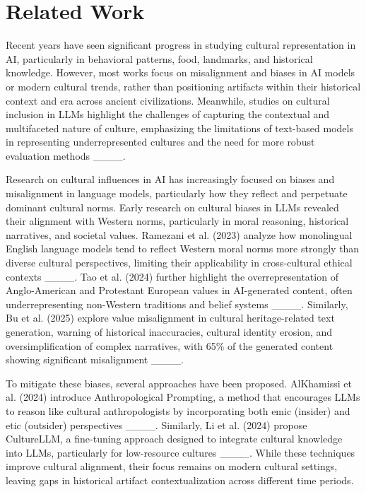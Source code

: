 \section{Related Work}
Recent years have seen significant progress in studying cultural representation in AI, particularly in behavioral patterns, food, landmarks, and historical knowledge. However, most works focus on misalignment and biases in AI models or modern cultural trends, rather than positioning artifacts within their historical context and era across ancient civilizations. Meanwhile, studies on cultural inclusion in LLMs highlight the challenges of capturing the contextual and multifaceted nature of culture, emphasizing the limitations of text-based models in representing underrepresented cultures and the need for more robust evaluation methods ____.

Research on cultural influences in AI has increasingly focused on biases and misalignment in language models, particularly how they reflect and perpetuate dominant cultural norms. Early research on cultural biases in LLMs revealed their alignment with Western norms, particularly in moral reasoning, historical narratives, and societal values. Ramezani et al. (2023) analyze how monolingual English language models tend to reflect Western moral norms more strongly than diverse cultural perspectives, limiting their applicability in cross-cultural ethical contexts ____. Tao et al. (2024) further highlight the overrepresentation of Anglo-American and Protestant European values in AI-generated content, often underrepresenting non-Western traditions and belief systems ____. Similarly, Bu et al. (2025) explore value misalignment in cultural heritage-related text generation, warning of historical inaccuracies, cultural identity erosion, and oversimplification of complex narratives, with 65\% of the generated content showing significant misalignment ____.

To mitigate these biases, several approaches have been proposed. AlKhamissi et al. (2024) introduce Anthropological Prompting, a method that encourages LLMs to reason like cultural anthropologists by incorporating both emic (insider) and etic (outsider) perspectives ____. Similarly, Li et al. (2024) propose CultureLLM, a fine-tuning approach designed to integrate cultural knowledge into LLMs, particularly for low-resource cultures ____. While these techniques improve cultural alignment, their focus remains on modern cultural settings, leaving gaps in historical artifact contextualization across different time periods.

